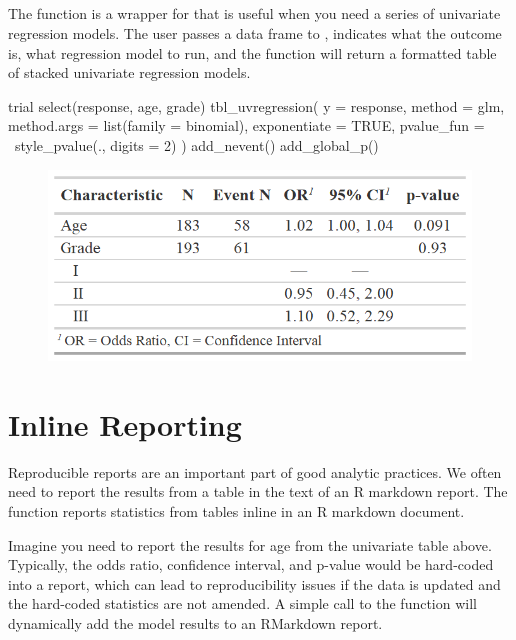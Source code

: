 \subsection{\texorpdfstring{}{tbl\_uvregression()}}

The  function is a wrapper for  that is useful when you need a series of univariate regression models.
The user passes a data frame to , indicates what the outcome is, what regression model to run, and the function will return a formatted table of stacked univariate regression models.

\begin{example}
trial %
  select(response, age, grade) %
  tbl_uvregression(
    y = response, 
    method = glm,
    method.args = list(family = binomial),
    exponentiate = TRUE,
    pvalue_fun = ~style_pvalue(., digits = 2)
  ) %
  add_nevent() %
  add_global_p()
\end{example}
\newpage
\begin{figure}[h!]
  \includegraphics[scale=0.49]{uvregression.png}
  \centering
\end{figure}

\section{Inline Reporting}

Reproducible reports are an important part of good analytic practices.
We often need to report the results from a table in the text of an R markdown report.
The   function reports statistics from  tables inline in an R markdown document.

Imagine you need to report the results for age from the univariate table above.
Typically, the odds ratio, confidence interval, and p-value would be hard-coded into a report, which can lead to reproducibility issues if the data is updated and the hard-coded statistics are not amended.
A simple call to the  function will dynamically add the model results to an RMarkdown report.


